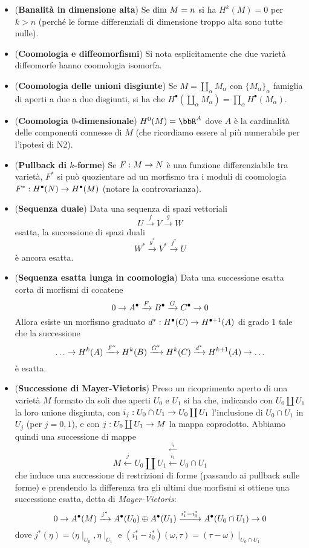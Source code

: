 \documentclass[a4paper,NoNotes,GeneralMath]{stdmdoc}
\newcommand{\xrar}[1]{\ensuremath{\xrightarrow{#1}}}
\newcommand{\xlar}[1]{\ensuremath{\xleftarrow{#1}}}
\begin{document}
\begin{itemize}
\item ({\bf Banalità in dimensione alta}) Se $\mbox{dim } M = n$ si ha $H^k (M) = 0$ per $k > n$ (perché le forme differenziali di dimensione troppo alta sono tutte nulle).
\item ({\bf Coomologia e diffeomorfismi}) Si nota esplicitamente che due varietà diffeomorfe hanno coomologia isomorfa.
\item ({\bf Coomologia delle unioni disgiunte}) Se $M = \coprod_\alpha M_\alpha$ con $\{M_\alpha\}_\alpha$ famiglia di aperti a due a due disgiunti, si ha che $H^\bullet (\coprod_\alpha M_\alpha) = \prod_\alpha H^\bullet(M_\alpha)$.
\item ({\bf Coomologia $0$-dimensionale}) $H^0(M) = \bbR^A$ dove $A$ è la cardinalità delle componenti connesse di $M$ (che ricordiamo essere al più numerabile per l'ipotesi di N2).
\item ({\bf Pullback di $k$-forme}) Se $F: M \rightarrow N$ è una funzione differenziabile tra varietà, $F^*$ si può quozientare ad un morfismo tra i moduli di coomologia $F^*: H^\bullet(N) \rightarrow H^\bullet(M)$ (notare la controvarianza).
\item ({\bf Sequenza duale}) Data una sequenza di spazi vettoriali
  $$ U \xrar{f} V \xrar{g} W $$
  esatta, la successione di spazi duali
  $$ W^* \xrar{g^*} V^* \xrar{f^*} U $$
  è ancora esatta.
\item ({\bf Sequenza esatta lunga in coomologia}) Data una successione esatta corta di morfismi di cocatene
  $$ 0 \rar A^\bullet \xrar{F} B^\bullet \xrar{G} C^\bullet \rar 0 $$
  Allora esiste un morfismo graduato $d^* : H^\bullet(C) \rightarrow H^{\bullet + 1} (A)$ di grado $1$ tale che la successione
  $$ \ldots \rar H^k(A) \xrar{F^*} H^k(B) \xrar{G^*} H^k(C) \xrar{d^*} H^{k+1}(A) \rar \ldots $$
  è esatta.
\item ({\bf Successione di Mayer-Vietoris}) Preso un ricoprimento aperto di una varietà $M$ formato da soli due aperti $U_0$ e $U_1$ si ha che, indicando con $U_0 \coprod U_1$ la loro unione disgiunta, con $i_j : U_0 \cap U_1 \rightarrow U_0 \coprod U_1$ l'inclusione di $U_0 \cap U_1$ in $U_j$ (per $j = 0, 1$), e con $j: U_0 \coprod U_1 \rightarrow M$ la mappa coprodotto. Abbiamo quindi una successione di mappe
  $$ M \xlar{j} U_0 \coprod U_1 \stackrel{\xlar{i_0}}{\xlar{i_1}} U_0 \cap U_1 $$
  che induce una successione di restrizioni di forme (passando ai pullback sulle forme) e prendendo la differenza tra gli ultimi due morfismi si ottiene una successione esatta, detta di {\it Mayer-Vietoris}:
  $$ 0 \rar A^\bullet(M) \xrar{j^*} A^\bullet(U_0) \oplus A^\bullet(U_1) \xrar{i_1^* - i_0^*} A^\bullet(U_0 \cap U_1) \rar 0 $$
  dove $j^*(\eta) = (\eta\mid_{U_0}, \eta\mid_{U_1}$ e $(i_1^* - i_0^*) (\omega, \tau) = (\tau - \omega) \mid_{U_0 \cap U_1}$


\end{itemize}
\end{document}

